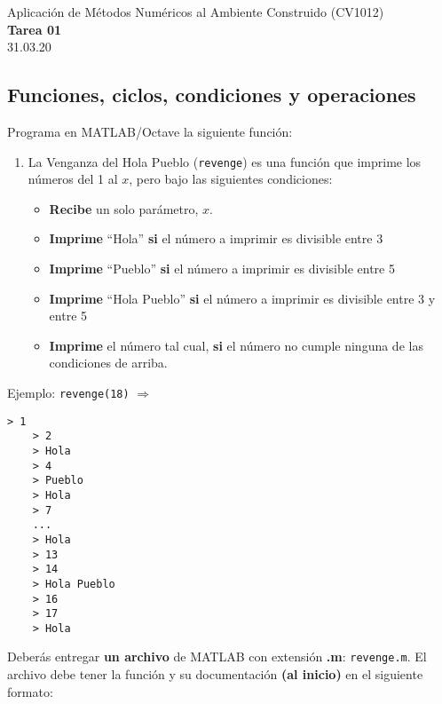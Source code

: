 \documentclass[]{book}
\newcommand{\matlab}[1]{\lstinline[style=Matlab-pyglike]!#1!}
\theoremstyle{definition}
\begin{document}
\begin{center}
{\huge Aplicación de Métodos Numéricos al Ambiente Construido (CV1012)}\\[1.5ex]
{\large \textbf{Tarea 01}\\[1.5ex] %
31.03.20} %
\end{center}

\vspace{0.2 cm}

\subsection*{Funciones, ciclos, condiciones y operaciones}

Programa en MATLAB/Octave la siguiente función:

\begin{enumerate}[label=\alph*)]
    \itemsep2.5ex
    \item La Venganza del Hola Pueblo (\matlab{revenge}) es una función que imprime los números del 1 al $x$, pero bajo las siguientes condiciones:
    \begin{itemize}
        \item \textbf{Recibe} un solo parámetro, $x$.
        \item \textbf{Imprime} ``Hola'' \textbf{si} el número a imprimir es divisible entre 3
        \item \textbf{Imprime} ``Pueblo'' \textbf{si} el número a imprimir es divisible entre 5
        \item \textbf{Imprime} ``Hola Pueblo'' \textbf{si} el número a imprimir es divisible entre 3 y entre 5
        \item \textbf{Imprime} el número tal cual, \textbf{si} el número no cumple ninguna de las condiciones de arriba.
    \end{itemize}
\end{enumerate}

Ejemplo: \texttt{revenge(18)} $\Rightarrow$
\begin{lstlisting}[style=Matlab-editor]
    > 1
    > 2
    > Hola
    > 4
    > Pueblo
    > Hola
    > 7
    ...
    > Hola
    > 13
    > 14
    > Hola Pueblo
    > 16
    > 17
    > Hola
\end{lstlisting}

\bigskip

Deberás entregar \textbf{un archivo} de MATLAB con extensión \textbf{.m}: \texttt{revenge.m}.
El archivo debe tener la función y su documentación \textbf{(al inicio)} en el siguiente formato:
\end{document}
